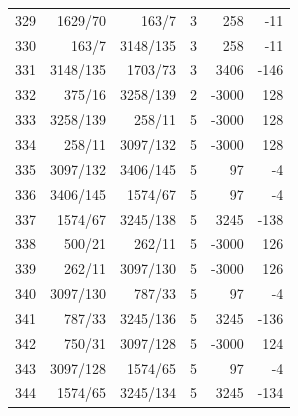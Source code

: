 \documentclass[11pt,a4paper]{article}
\begin{document}
\begin{minipage}[t]{.49\linewidth}
\begin{tabular*}{\linewidth}{@{}r@{\extracolsep{\fill}}rrrrr@{}}
329 & 1629/70 & 163/7 & 3 & 258 & -11\\
330 & 163/7 & 3148/135 & 3 & 258 & -11\\
331 & 3148/135 & 1703/73 & 3 & 3406 & -146\\
332 & 375/16 & 3258/139 & 2 & -3000 & 128\\
333 & 3258/139 & 258/11 & 5 & -3000 & 128\\
334 & 258/11 & 3097/132 & 5 & -3000 & 128\\
335 & 3097/132 & 3406/145 & 5 & 97 & -4\\
336 & 3406/145 & 1574/67 & 5 & 97 & -4\\
337 & 1574/67 & 3245/138 & 5 & 3245 & -138\\
338 & 500/21 & 262/11 & 5 & -3000 & 126\\
339 & 262/11 & 3097/130 & 5 & -3000 & 126\\
340 & 3097/130 & 787/33 & 5 & 97 & -4\\
341 & 787/33 & 3245/136 & 5 & 3245 & -136\\
342 & 750/31 & 3097/128 & 5 & -3000 & 124\\
343 & 3097/128 & 1574/65 & 5 & 97 & -4\\
344 & 1574/65 & 3245/134 & 5 & 3245 & -134\\
\bottomrule\end{tabular*}\end{minipage}\par
\clearpage
{}\par\vspace{4pt}
\end{document}
